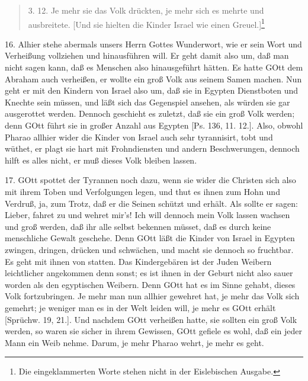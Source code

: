 \begin{quote}
3. 12. Je mehr sie das Volk drückten, je mehr sich es mehrte und ausbreitete. [Und sie hielten die Kinder Israel wie einen Greuel.]\footnote{Die eingeklammerten Worte stehen nicht in der Eislebischen Ausgabe.}
\end{quote}

16. Alhier stehe abermals unsers Herrn Gottes Wunderwort, wie er sein Wort und Verheißung vollziehen und hinausführen will. Er geht damit also um, daß man nicht sagen kann, daß es Menschen also hinausgeführt hätten. Es hatte GOtt dem Abraham auch verheißen, er wollte ein groß Volk aus seinem Samen machen. Nun geht er mit den Kindern von Israel also um, daß sie in Egypten Dienstboten und Knechte sein müssen, und läßt sich das Gegenspiel ansehen, als würden sie gar ausgerottet werden. Dennoch geschieht es zuletzt, daß sie ein groß Volk werden; denn GOtt führt sie in großer Anzahl aus Egypten [Ps. 136, 11. 12.]. Also, obwohl Pharao allhier wider die Kinder von Israel auch sehr tyrannisirt, tobt und wüthet, er plagt sie hart mit Frohndiensten und andern Beschwerungen, dennoch hilft es alles nicht, er muß dieses Volk bleiben lassen.

17. GOtt spottet der Tyrannen noch dazu, wenn sie wider die Christen sich also mit ihrem Toben und Verfolgungen legen, und thut es ihnen zum Hohn und Verdruß, ja, zum Trotz, daß er die Seinen schützt und erhält. Als sollte er sagen: Lieber, fahret zu und wehret mir’s! Ich will dennoch mein Volk lassen wachsen und groß werden, daß ihr alle selbst bekennen müsset, daß es durch keine menschliche Gewalt geschehe. Denn GOtt läßt die Kinder von Israel in Egypten zwingen, dringen, drücken und schwächen, und macht sie dennoch so fruchtbar. Es geht mit ihnen von statten. Das Kindergebären ist der Juden Weibern leichtlicher angekommen denn sonst; es ist ihnen in der Geburt nicht also sauer worden als den egyptischen Weibern. Denn GOtt hat es im Sinne gehabt, dieses Volk fortzubringen. Je mehr man nun allhier gewehret hat, je mehr das Volk sich gemehrt; je weniger man es in der Welt leiden will, je mehr es GOtt erhält [Sprüchw. 19, 21.]. Und nachdem GOtt verheißen hatte, sie sollten ein groß Volk werden, so waren sie sicher in ihrem Gewissen, GOtt gefiele es wohl, daß ein jeder Mann ein Weib nehme. Darum, je mehr Pharao wehrt, je mehr es geht.

